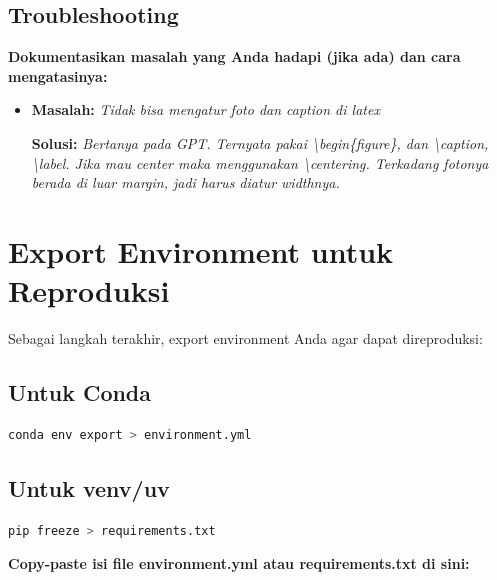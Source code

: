 \documentclass[11pt,a4paper]{article}
\begin{document}
\subsection{Troubleshooting}
\textbf{Dokumentasikan masalah yang Anda hadapi (jika ada) dan cara mengatasinya:}

    \begin{itemize}
    \item \textbf{Masalah:} \textit{Tidak bisa mengatur foto dan caption di latex}
    
    \textbf{Solusi:} \textit{Bertanya pada GPT. Ternyata pakai \textbackslash{}begin\{figure\}, dan \textbackslash{}caption, \textbackslash{}label. Jika mau center maka menggunakan \textbackslash{}centering. Terkadang fotonya berada di luar margin, jadi harus diatur widthnya.}
    \end{itemize}


\section{Export Environment untuk Reproduksi}
Sebagai langkah terakhir, export environment Anda agar dapat direproduksi:

\subsection{Untuk Conda}
\begin{lstlisting}[language=bash, caption=Export conda environment]
conda env export > environment.yml
\end{lstlisting}

\subsection{Untuk venv/uv}
\begin{lstlisting}[language=bash, caption=Export pip requirements]
pip freeze > requirements.txt
\end{lstlisting}

\textbf{Copy-paste isi file environment.yml atau requirements.txt di sini:}
\end{document}
